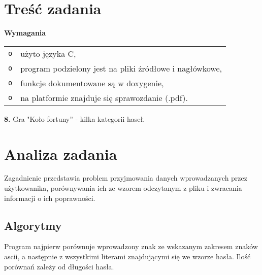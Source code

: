 \documentclass[12pt,a4paper,oneside]{article}
\begin{document}
\section{Treść zadania}
\textbf{Wymagania}
\newline
\begin{tabular}{ll}
\texttt{o}  & użyto języka C,\\
\texttt{o}  & program podzielony jest na pliki źródłowe i nagłówkowe,\\
\texttt{o}  & funkcje dokumentowane są w doxygenie,\\
\texttt{o}  & na platformie znajduje się sprawozdanie (.pdf).\\
\end{tabular}
\newline 
\newline
\textbf{8.} Gra "Koło fortuny'' - kilka kategorii haseł.
\newline

\section{Analiza zadania}
Zagadnienie przedstawia problem przyjmowania danych wprowadzanych przez użytkowanika, porównywania ich ze wzorem odczytanym z pliku i zwracania informacji o ich poprawności.




\subsection{Algorytmy}
Program najpierw porównuje wprowadzony znak ze wskazanym zakresem znaków ascii, a następnie z wszystkimi literami znajdującymi się we wzorze hasła. Ilość porównań zależy od długości hasła.     
\end{document}
